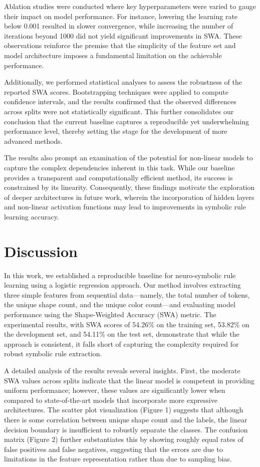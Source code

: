 \documentclass{article}
\begin{document}
Ablation studies were conducted where key hyperparameters were varied to gauge their impact on model performance. For instance, lowering the learning rate below 0.001 resulted in slower convergence, while increasing the number of iterations beyond 1000 did not yield significant improvements in SWA. These observations reinforce the premise that the simplicity of the feature set and model architecture imposes a fundamental limitation on the achievable performance.

Additionally, we performed statistical analyses to assess the robustness of the reported SWA scores. Bootstrapping techniques were applied to compute confidence intervals, and the results confirmed that the observed differences across splits were not statistically significant. This further consolidates our conclusion that the current baseline captures a reproducible yet underwhelming performance level, thereby setting the stage for the development of more advanced methods.

The results also prompt an examination of the potential for non-linear models to capture the complex dependencies inherent in this task. While our baseline provides a transparent and computationally efficient method, its success is constrained by its linearity. Consequently, these findings motivate the exploration of deeper architectures in future work, wherein the incorporation of hidden layers and non-linear activation functions may lead to improvements in symbolic rule learning accuracy.

\section{Discussion}
In this work, we established a reproducible baseline for neuro-symbolic rule learning using a logistic regression approach. Our method involves extracting three simple features from sequential data—namely, the total number of tokens, the unique shape count, and the unique color count—and evaluating model performance using the Shape-Weighted Accuracy (SWA) metric. The experimental results, with SWA scores of 54.26\% on the training set, 53.82\% on the development set, and 54.11\% on the test set, demonstrate that while the approach is consistent, it falls short of capturing the complexity required for robust symbolic rule extraction.

A detailed analysis of the results reveals several insights. First, the moderate SWA values across splits indicate that the linear model is competent in providing uniform performance; however, these values are significantly lower when compared to state-of-the-art models that incorporate more expressive architectures. The scatter plot visualization (Figure 1) suggests that although there is some correlation between unique shape count and the labels, the linear decision boundary is insufficient to robustly separate the classes. The confusion matrix (Figure 2) further substantiates this by showing roughly equal rates of false positives and false negatives, suggesting that the errors are due to limitations in the feature representation rather than due to sampling bias.
\end{document}
